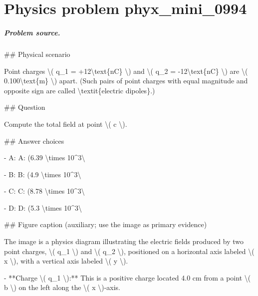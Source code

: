 
\chapter{Physics problem phyx\_mini\_0994}
\label{ch:PhyXMiniProblems_problem_phyx_mini_0994}

\paragraph{Problem source.}
\#\# Physical scenario

Point charges \textbackslash{}( q\_1 = +12\textbackslash{}text\{nC\} \textbackslash{}) and \textbackslash{}( q\_2 = -12\textbackslash{}text\{nC\} \textbackslash{}) are \textbackslash{}( 0.100\textbackslash{}text\{m\} \textbackslash{}) apart. (Such pairs of point charges with equal magnitude and opposite sign are called \textbackslash{}textit\{electric dipoles\}.)

\#\# Question

Compute the total field at point \textbackslash{}( c \textbackslash{}).

\#\# Answer choices

- A: A: (6.39 \textbackslash{}times 10\textasciicircum{}3\textbackslash{}

- B: B: (4.9 \textbackslash{}times 10\textasciicircum{}3\textbackslash{}

- C: C: (8.78 \textbackslash{}times 10\textasciicircum{}3\textbackslash{}

- D: D: (5.3 \textbackslash{}times 10\textasciicircum{}3\textbackslash{}

\#\# Figure caption (auxiliary; use the image as primary evidence)

The image is a physics diagram illustrating the electric fields produced by two point charges, \textbackslash{}( q\_1 \textbackslash{}) and \textbackslash{}( q\_2 \textbackslash{}), positioned on a horizontal axis labeled \textbackslash{}( x \textbackslash{}), with a vertical axis labeled \textbackslash{}( y \textbackslash{}).

- **Charge \textbackslash{}( q\_1 \textbackslash{}):** This is a positive charge located 4.0 cm from a point \textbackslash{}( b \textbackslash{}) on the left along the \textbackslash{}( x \textbackslash{})-axis.

